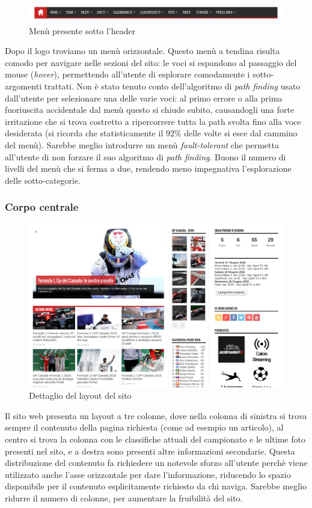 \begin{figure}[H]
  \centering
  \includegraphics[scale=0.3]{top_menu}
  \caption{Menù presente sotto l'header}
\end{figure}
Dopo il logo troviamo un men\`u orizzontale. Questo men\`u a tendina risulta
comodo per navigare nelle sezioni del sito: le voci si espandono al passaggio
del mouse (\textit{hover}), permettendo all'utente di esplorare comodamente i
sotto-argomenti trattati. Non \`e stato tenuto conto dell'algoritmo di
\textit{path finding} usato dall'utente per selezionare una delle varie voci: al
primo errore o alla prima fuoriuscita accidentale dal men\`u questo si chiude
subito, causandogli una forte irritazione che si trova
costretto a ripercorrere tutta la path svolta fino alla voce desiderata (si
ricorda che statisticamente il 92\% delle volte si esce dal cammino del men\`u).
Sarebbe meglio introdurre un men\`u \textit{fault-tolerant} che permetta
all'utente di non forzare il suo algoritmo di \textit{path finding}. Buono il
numero di livelli del men\`u che si ferma a due, rendendo meno impegnativa
l'esplorazione delle sotto-categorie.

\subsubsection{Corpo centrale}


\begin{figure}[H]
  \centering
  \includegraphics[scale=0.2]{layout}
  \caption{Dettaglio del layout del sito}
\end{figure}
Il sito web presenta un layout a tre colonne, dove nella colonna di sinistra si
trova sempre il contenuto della pagina richiesta (come ad esempio un articolo),
al centro si trova la colonna con le classifiche attuali del campionato e le
ultime foto presenti nel sito, e a destra sono presenti altre informazioni
secondarie. Questa distribuzione del contenuto fa richiedere un notevole sforzo
all'utente perch\`e viene utilizzato anche l'asse orizzontale per dare
l'informazione, riducendo lo spazio disponibile per il contenuto esplicitamente
richiesto da chi naviga. Sarebbe meglio ridurre il numero di colonne, per
aumentare la fruibilit\`a del sito.

